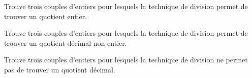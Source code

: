 \begin{myenumerate}
\item  Trouve trois couples  d'entiers pour  lesquels la  technique de
  division permet de trouver un quotient entier. 
\item  Trouve trois couples  d'entiers pour  lesquels la  technique de
  division permet de trouver un quotient décimal non entier. 
\item  Trouve trois couples  d'entiers pour  lesquels la  technique de
  division ne permet pas de trouver un quotient décimal. 
\end{myenumerate}